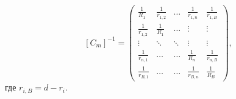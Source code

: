 \begin{equation}
\label{eq:cm_inv}
	[C_m]^{-1} = 
	\begin{pmatrix}
		\frac{1}{R_1}	&	\frac{1}{r_{1,2}}	&	\dots		&	\frac{1}{r_{1,n}}	&	\frac{1}{r_{1,B}} \\
		\frac{1}{r_{1,2}}	&	\frac{1}{R_1}	&	\dots		&	\vdots		&	\vdots \\
		\vdots		&	\ddots		&	\ddots	&	\vdots		&	\vdots \\
		\frac{1}{r_{n,1}}	&	\dots			&	\dots		&	\frac{1}{R_n}	&	\frac{1}{r_{n,B}} \\
		\frac{1}{r_{B,1}}	&	\dots			&	\dots		&	\frac{1}{r_{B,n}}	&	\frac{1}{R_B}
	\end{pmatrix},
\end{equation}
где $r_{i,B} = d - r_i$.

